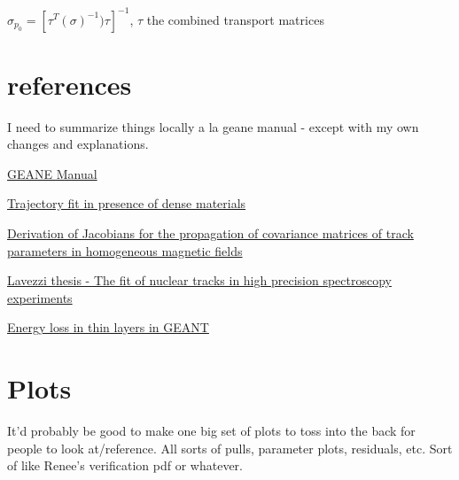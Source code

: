\documentclass{article}
\begin{document}
$\sigma_{p_{0}} = [\tau^{T} (\sigma)^{-1}) \tau ]^{-1}$, $\tau$ the combined transport matrices






\section{references}

  I need to summarize things locally a la geane manual - except with my own changes and explanations.

	\href{http://innocentonnice.web.cern.ch/innocentonnice/napoli99/geane_manual.ps}{GEANE Manual}

	\href{http://www.sciencedirect.com/science/article/pii/016890029390992Q}{Trajectory fit in presence of dense materials}

	\href{http://www.sciencedirect.com/science/article/pii/S0168900206013143}{Derivation of Jacobians for the propagation of covariance matrices of track parameters in homogeneous magnetic fields}

	\href{http://bamboo.pv.infn.it/doc/L_Lavezzi.pdf}{Lavezzi thesis - The fit of nuclear tracks in high precision spectroscopy experiments}

  \href{http://www.sciencedirect.com/science/article/pii/0168900295003444}{Energy loss in thin layers in GEANT}


\section{Plots}

It'd probably be good to make one big set of plots to toss into the back for people to look at/reference. All sorts of pulls, parameter plots, residuals, etc. Sort of like Renee's verification pdf or whatever.
\end{document}
